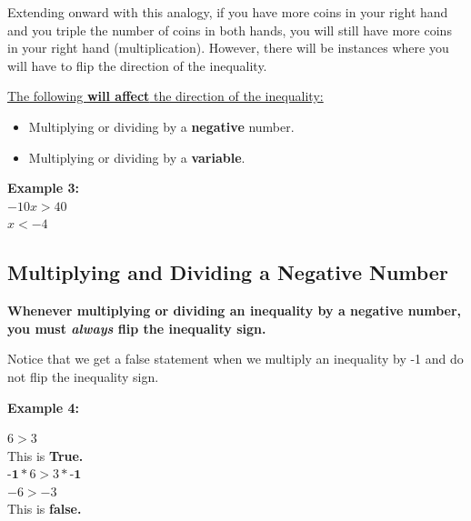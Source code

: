 \documentclass[12pt,fleqn]{book} %
\begin{document}
\noindent Extending onward with this analogy, if you have more coins in your right hand and you triple the number of coins in both hands, you will still have more coins in your right hand (multiplication). However, there will be instances where you will have to flip the direction of the inequality.

\pagebreak

\begin{center}
\noindent \underline{The following \textbf{will affect} the direction of the inequality:}
\begin{multicols}{2}
\begin{itemize}
    \item Multiplying or dividing by a \textbf{negative} number.
    \item Multiplying or dividing by a \textbf{variable}.
\end{itemize}
\columnbreak
\textbf{Example 3:}\\
$-10x > 40$\\
$x<-4$
\end{multicols}
\end{center}


\subsection{Multiplying and Dividing a Negative Number}
\begin{center}
\textbf{Whenever multiplying or dividing an inequality by a negative number, you must \emph{always} flip the inequality sign.}\\
\end{center}

\noindent Notice that we get a false statement when we multiply an inequality by -1 and do not flip the inequality sign.

\noindent\textbf{Example 4:}

\vspace*{-5mm}

\begin{center}
    $6>3$\\
    This is \textbf{True.}\\
    $\textbf{-1}*6>3*\textbf{-1}$\\
    $-6>-3$\\
    This is \textbf{false.}\\
\end{center}
\end{document}
